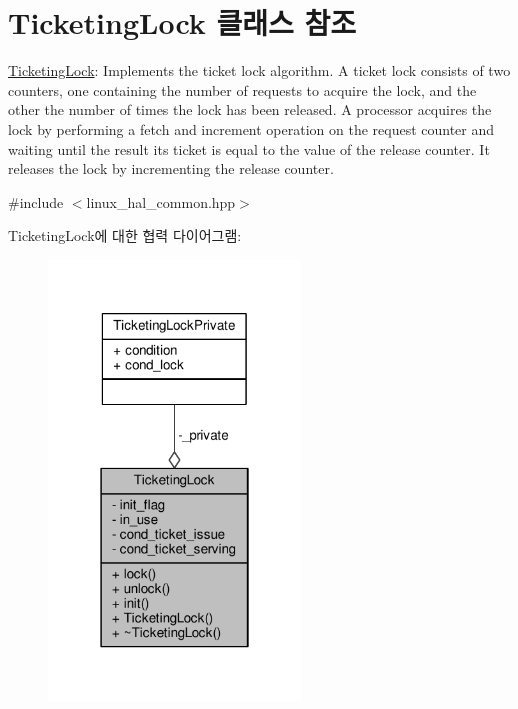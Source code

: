 \hypertarget{class_ticketing_lock}{}\section{Ticketing\+Lock 클래스 참조}
\label{class_ticketing_lock}


\hyperlink{class_ticketing_lock}{Ticketing\+Lock}\+: Implements the ticket lock algorithm. A ticket lock consists of two counters, one containing the number of requests to acquire the lock, and the other the number of times the lock has been released. A processor acquires the lock by performing a fetch and increment operation on the request counter and waiting until the result its ticket is equal to the value of the release counter. It releases the lock by incrementing the release counter.  




{\ttfamily \#include $<$linux\+\_\+hal\+\_\+common.\+hpp$>$}



Ticketing\+Lock에 대한 협력 다이어그램\+:
\nopagebreak
\begin{figure}[H]
\begin{center}
\leavevmode
\includegraphics[width=190pt]{class_ticketing_lock__coll__graph}
\end{center}
\end{figure}
